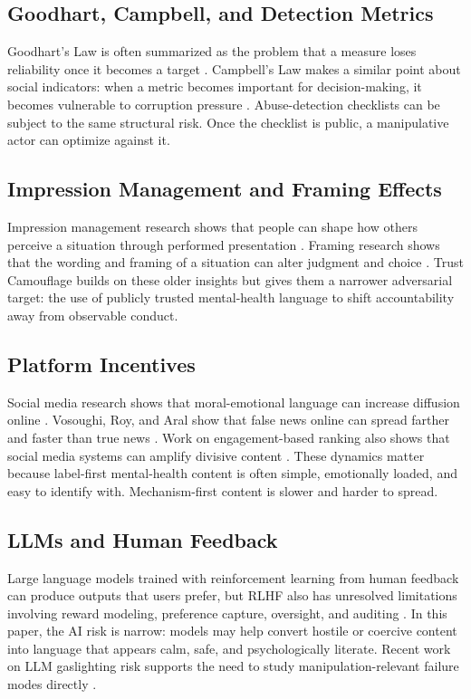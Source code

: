 \documentclass[11pt, letterpaper]{article}
\begin{document}
\subsection{Goodhart, Campbell, and Detection Metrics}

Goodhart's Law is often summarized as the problem that a measure loses reliability once it becomes a target \cite{Goodhart1975}. Campbell's Law makes a similar point about social indicators: when a metric becomes important for decision-making, it becomes vulnerable to corruption pressure \cite{Campbell1979}. Abuse-detection checklists can be subject to the same structural risk. Once the checklist is public, a manipulative actor can optimize against it.

\subsection{Impression Management and Framing Effects}

Impression management research shows that people can shape how others perceive a situation through performed presentation \cite{Goffman1959}. Framing research shows that the wording and framing of a situation can alter judgment and choice \cite{TverskyKahneman1981}. Trust Camouflage builds on these older insights but gives them a narrower adversarial target: the use of publicly trusted mental-health language to shift accountability away from observable conduct.

\subsection{Platform Incentives}

Social media research shows that moral-emotional language can increase diffusion online \cite{Brady2017}. Vosoughi, Roy, and Aral show that false news online can spread farther and faster than true news \cite{Vosoughi2018}. Work on engagement-based ranking also shows that social media systems can amplify divisive content \cite{Milli2025}. These dynamics matter because label-first mental-health content is often simple, emotionally loaded, and easy to identify with. Mechanism-first content is slower and harder to spread.

\subsection{LLMs and Human Feedback}

Large language models trained with reinforcement learning from human feedback can produce outputs that users prefer, but RLHF also has unresolved limitations involving reward modeling, preference capture, oversight, and auditing \cite{Ouyang2022,Casper2023}. In this paper, the AI risk is narrow: models may help convert hostile or coercive content into language that appears calm, safe, and psychologically literate. Recent work on LLM gaslighting risk supports the need to study manipulation-relevant failure modes directly \cite{Li2025}.
\end{document}
